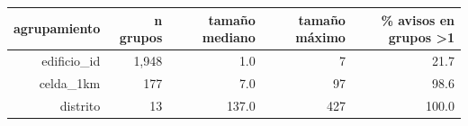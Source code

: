 \begin{tabular}{rrrrr}
\toprule
agrupamiento & n grupos & tamaño mediano & tamaño máximo & \% avisos en grupos >1 \\
\midrule
edificio\_id & 1,948 & 1.0 & 7 & 21.7 \\
celda\_1km & 177 & 7.0 & 97 & 98.6 \\
distrito & 13 & 137.0 & 427 & 100.0 \\
\bottomrule
\end{tabular}